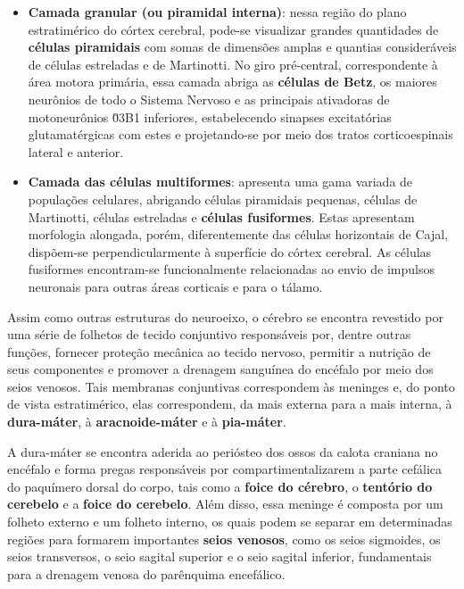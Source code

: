 \documentclass[
]{book}
\begin{document}
\begin{itemize}
\item
  \textbf{Camada granular (ou piramidal interna)}: nessa região do plano estratimérico do córtex cerebral, pode-se visualizar grandes quantidades de \textbf{células piramidais} com somas de dimensões amplas e quantias consideráveis de células estreladas e de Martinotti. No giro pré-central, correspondente à área motora primária, essa camada abriga as \textbf{células de Betz}, os maiores neurônios de todo o Sistema Nervoso e as principais ativadoras de motoneurônios \u03B1 inferiores, estabelecendo sinapses excitatórias glutamatérgicas com estes e projetando-se por meio dos tratos corticoespinais lateral e anterior.
\item
  \textbf{Camada das células multiformes}: apresenta uma gama variada de populações celulares, abrigando células piramidais pequenas, células de Martinotti, células estreladas e \textbf{células fusiformes}. Estas apresentam morfologia alongada, porém, diferentemente das células horizontais de Cajal, dispõem-se perpendicularmente à superfície do córtex cerebral. As células fusiformes encontram-se funcionalmente relacionadas ao envio de impulsos neuronais para outras áreas corticais e para o tálamo.
\end{itemize}

Assim como outras estruturas do neuroeixo, o cérebro se encontra revestido por uma série de folhetos de tecido conjuntivo responsáveis por, dentre outras funções, fornecer proteção mecânica ao tecido nervoso, permitir a nutrição de seus componentes e promover a drenagem sanguínea do encéfalo por meio dos seios venosos. Tais membranas conjuntivas correspondem às meninges e, do ponto de vista estratimérico, elas correspondem, da mais externa para a mais interna, à \textbf{dura-máter}, à \textbf{aracnoide-máter} e à \textbf{pia-máter}.

A dura-máter se encontra aderida ao periósteo dos ossos da calota craniana no encéfalo e forma pregas responsáveis por compartimentalizarem a parte cefálica do paquímero dorsal do corpo, tais como a \textbf{foice do cérebro}, o \textbf{tentório do cerebelo} e a \textbf{foice do cerebelo}. Além disso, essa meninge é composta por um folheto externo e um folheto interno, os quais podem se separar em determinadas regiões para formarem importantes \textbf{seios venosos}, como os seios sigmoides, os seios transversos, o seio sagital superior e o seio sagital inferior, fundamentais para a drenagem venosa do parênquima encefálico.
\end{document}
